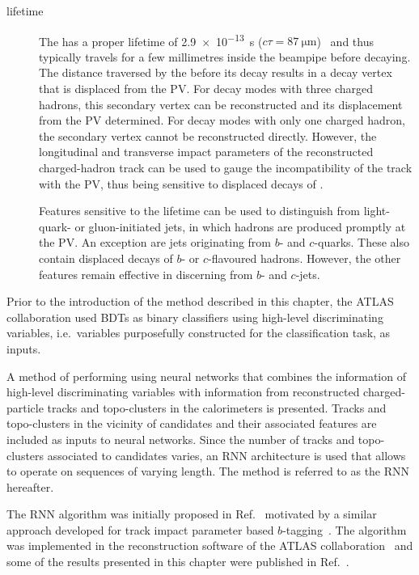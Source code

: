 \begin{description}
\item[\taulepton lifetime] The \taulepton has a proper lifetime of
  \SI{2.9e-13}{\second} ($c \tau = \SI{87}{\micro\metre}$)~\cite{pdg2020} and
  thus typically travels for a few millimetres inside the beampipe before
  decaying. The distance traversed by the \taulepton before its decay results in
  a decay vertex that is displaced from the PV. For \taulepton decay modes with
  three charged hadrons, this secondary vertex can be reconstructed and its
  displacement from the PV determined. For decay modes with only one charged
  hadron, the secondary vertex cannot be reconstructed directly. However, the
  longitudinal and transverse impact parameters of the reconstructed
  charged-hadron track can be used to gauge the incompatibility of the track
  with the PV, thus being sensitive to displaced decays of \tauleptons.

  Features sensitive to the \taulepton lifetime can be used to distinguish
  \tauhad from light-quark- or gluon-initiated jets, in which hadrons are
  produced promptly at the PV. An exception are jets originating from $b$- and
  $c$-quarks. These also contain displaced decays of $b$- or $c$-flavoured
  hadrons. However, the other features remain effective in discerning \tauhad
  from $b$- and $c$-jets.

\end{description}
Prior to the introduction of the method described in this chapter, the
ATLAS collaboration used BDTs as binary classifiers using high-level
discriminating variables, i.e.\ variables purposefully constructed for
the classification task, as inputs.

A method of performing \tauid using neural networks that combines the
information of high-level discriminating variables with information from
reconstructed charged-particle tracks and topo-clusters in the calorimeters is
presented. Tracks and topo-clusters in the vicinity of \tauhadvis candidates and
their associated features are included as inputs to neural networks. Since the
number of tracks and topo-clusters associated to \tauhadvis candidates varies,
an RNN architecture is used that allows to operate on sequences of varying
length. The method is referred to as the RNN \tauid hereafter.

The RNN \tauid algorithm was initially proposed in Ref.~\cite{cdeutsch-master}
motivated by a similar approach developed for track impact parameter based
$b$-tagging~\cite{ATL-PHYS-PUB-2017-003}. The algorithm was implemented in the
reconstruction software of the ATLAS collaboration~\cite{ATL-SOFT-PUB-2021-001}
and some of the results presented in this chapter were published in
Ref.~\cite{ATL-PHYS-PUB-2019-033}.

